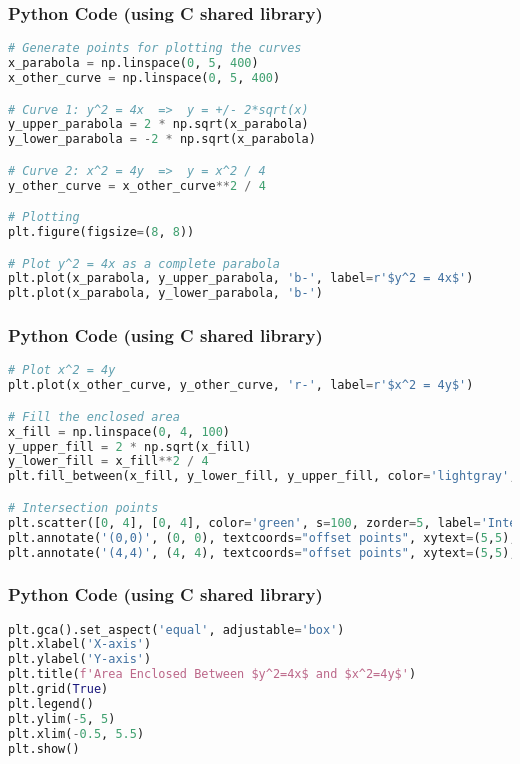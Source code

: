 \documentclass{beamer}
\begin{document}
\begin{frame}[fragile]
\frametitle{Python Code (using C shared library)}
\begin{lstlisting}[language=Python]
# Generate points for plotting the curves
x_parabola = np.linspace(0, 5, 400) 
x_other_curve = np.linspace(0, 5, 400) 

# Curve 1: y^2 = 4x  =>  y = +/- 2*sqrt(x)
y_upper_parabola = 2 * np.sqrt(x_parabola)
y_lower_parabola = -2 * np.sqrt(x_parabola)

# Curve 2: x^2 = 4y  =>  y = x^2 / 4
y_other_curve = x_other_curve**2 / 4

# Plotting
plt.figure(figsize=(8, 8))

# Plot y^2 = 4x as a complete parabola
plt.plot(x_parabola, y_upper_parabola, 'b-', label=r'$y^2 = 4x$') 
plt.plot(x_parabola, y_lower_parabola, 'b-') 
\end{lstlisting}
\end{frame}

\begin{frame}[fragile]
\frametitle{Python Code (using C shared library)}
\begin{lstlisting}[language=Python]
# Plot x^2 = 4y
plt.plot(x_other_curve, y_other_curve, 'r-', label=r'$x^2 = 4y$')

# Fill the enclosed area 
x_fill = np.linspace(0, 4, 100)
y_upper_fill = 2 * np.sqrt(x_fill) 
y_lower_fill = x_fill**2 / 4       
plt.fill_between(x_fill, y_lower_fill, y_upper_fill, color='lightgray', alpha=0.5, label='Enclosed Area')

# Intersection points
plt.scatter([0, 4], [0, 4], color='green', s=100, zorder=5, label='Intersection Points')
plt.annotate('(0,0)', (0, 0), textcoords="offset points", xytext=(5,5), ha='left')
plt.annotate('(4,4)', (4, 4), textcoords="offset points", xytext=(5,5), ha='left')
\end{lstlisting}
\end{frame}

\begin{frame}[fragile]
\frametitle{Python Code (using C shared library)}
\begin{lstlisting}[language=Python]
plt.gca().set_aspect('equal', adjustable='box')
plt.xlabel('X-axis')
plt.ylabel('Y-axis')
plt.title(f'Area Enclosed Between $y^2=4x$ and $x^2=4y$')
plt.grid(True)
plt.legend()
plt.ylim(-5, 5) 
plt.xlim(-0.5, 5.5) 
plt.show()
\end{lstlisting}
\end{frame}
\end{document}
